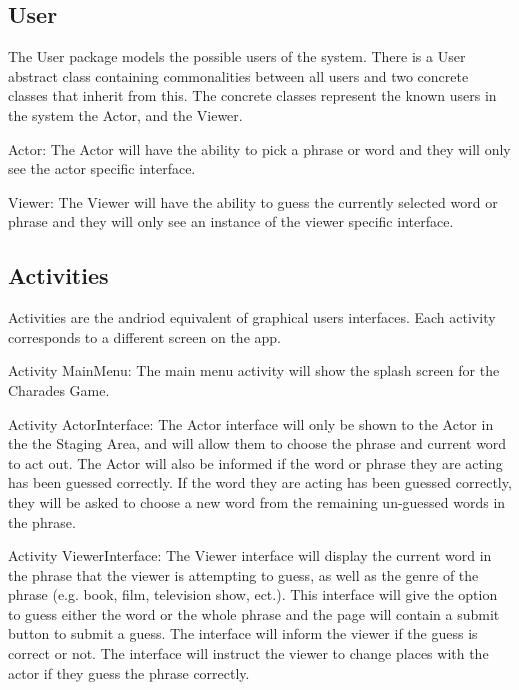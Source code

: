 \documentclass{article}
\begin{document}
\subsection{User}
The User package models the possible users of the system. There is a User abstract class containing commonalities between all users and two concrete classes that inherit from this. The concrete classes represent the known users in the system the Actor, and the Viewer. 

Actor: The Actor will have the ability to pick a phrase or word and they will only see the actor specific interface.

Viewer: The Viewer will have the ability to guess the currently selected word or phrase and they will only see an instance of the viewer specific interface.

\subsection{Activities}
Activities are the andriod equivalent of graphical users interfaces. Each activity corresponds to a different screen on the app.

Activity MainMenu: The main menu activity will show the splash screen for the Charades Game.

Activity ActorInterface: The Actor interface will only be shown to the Actor in the the Staging Area, and will allow them to choose the phrase and current word to act out. The Actor will also be informed if the word or phrase they are acting has been guessed correctly. If the word they are acting has been guessed correctly, they will be asked to choose a new word from the remaining un-guessed words in the phrase.

Activity ViewerInterface: The Viewer interface will display the current word in the phrase that the viewer is attempting to guess, as well as the genre of the phrase (e.g. book, film, television show, ect.). This interface will give the option to guess either the word or the whole phrase and the page will contain a submit button to submit a guess. The interface will inform the viewer if the guess is correct or not. The interface will instruct the viewer to change places with the actor if they guess the phrase correctly.
\end{document}
